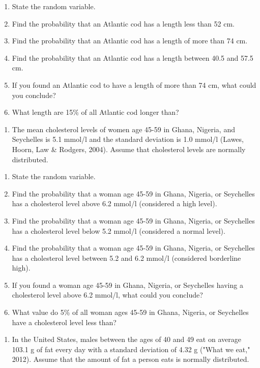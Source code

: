 \documentclass[
]{book}
\providecommand{\tightlist}{%
  \setlength{\itemsep}{0pt}\setlength{\parskip}{0pt}}
\begin{document}
\begin{enumerate}
\def\labelenumi{\alph{enumi}.}
\tightlist
\item
  State the random variable.
\item
  Find the probability that an Atlantic cod has a length less than 52 cm.
\item
  Find the probability that an Atlantic cod has a length of more than 74 cm.
\item
  Find the probability that an Atlantic cod has a length between 40.5 and 57.5 cm.
\item
  If you found an Atlantic cod to have a length of more than 74 cm, what could you conclude?
\item
  What length are 15\% of all Atlantic cod longer than?
\end{enumerate}

\begin{enumerate}
\def\labelenumi{\arabic{enumi}.}
\setcounter{enumi}{5}
\tightlist
\item
  The mean cholesterol levels of women age 45-59 in Ghana, Nigeria, and Seychelles is 5.1 mmol/l and the standard deviation is 1.0 mmol/l (Lawes, Hoorn, Law \& Rodgers, 2004). Assume that cholesterol levels are normally distributed.
\end{enumerate}

\begin{enumerate}
\def\labelenumi{\alph{enumi}.}
\tightlist
\item
  State the random variable.
\item
  Find the probability that a woman age 45-59 in Ghana, Nigeria, or Seychelles has a cholesterol level above 6.2 mmol/l (considered a high level).
\item
  Find the probability that a woman age 45-59 in Ghana, Nigeria, or Seychelles has a cholesterol level below 5.2 mmol/l (considered a normal level).
\item
  Find the probability that a woman age 45-59 in Ghana, Nigeria, or Seychelles has a cholesterol level between 5.2 and 6.2 mmol/l (considered borderline high).
\item
  If you found a woman age 45-59 in Ghana, Nigeria, or Seychelles having a cholesterol level above 6.2 mmol/l, what could you conclude?
\item
  What value do 5\% of all woman ages 45-59 in Ghana, Nigeria, or Seychelles have a cholesterol level less than?
\end{enumerate}

\begin{enumerate}
\def\labelenumi{\arabic{enumi}.}
\setcounter{enumi}{6}
\tightlist
\item
  In the United States, males between the ages of 40 and 49 eat on average 103.1 g of fat every day with a standard deviation of 4.32 g ("What we eat," 2012). Assume that the amount of fat a person eats is normally distributed.
\end{enumerate}
\end{document}
